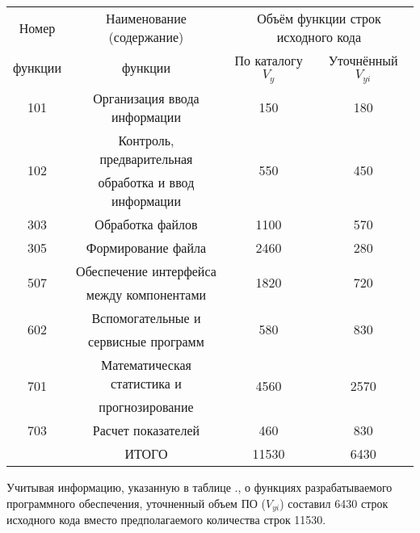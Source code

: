 {{\begin{Center}
		\begin{tabular}{|c|c|c|c|}
		\hline
		Номер  				 & Наименование (содержание) 			& \multicolumn{2}{c|}{Объём функции строк исходного кода} \\ \cline{3-4}
  		функции			     & функции								& По каталогу $V_y$     & Уточнённый $V_{yi}$ 			  \\ \hline
		101 				 & Организация ввода информации         & 150 				    & 180 					          \\ \hline
		\multirow{2}{*}{102} & Контроль, предварительная  			& \multirow{2}{*}{550}  & \multirow{2}{*}{450} 			  \\
		                     & обработка и ввод информации			&                       &                      		      \\ \hline
		303                  & Обработка файлов						& 1100				    & 570							  \\ \hline
		305                  & Формирование файла					& 2460				    & 280							  \\ \hline
		\multirow{2}{*}{507} & Обеспечение интерфейса				& \multirow{2}{*}{1820} & \multirow{2}{*}{720} 			  \\
							 & между компонентами        			&                       &                      		      \\ \hline
		\multirow{2}{*}{602} & Вспомогательные и 					& \multirow{2}{*}{580}  & \multirow{2}{*}{830}			  \\ 
							 & сервисные программ        			&                       &                      		      \\ \hline
		\multirow{2}{*}{701} & Математическая статистика и			& \multirow{2}{*}{4560} & \multirow{2}{*}{2570}			  \\ 
							 & прогнозирование	        			&                       &                      		      \\ \hline
		703                  & Расчет показателей					& 460				    & 830							  \\ \hline
		                     & ИТОГО								& 11530				    & 6430							  \\ \hline
	\end{tabular} \end{Center}}
	\botTablespace

	\redline Учитывая информацию, указанную в таблице \thechaptercntr .\thetablecntr, о функциях разрабатываемого программного обеспечения, уточненный объем ПО ($V_{yi}$) составил 6430 строк исходного кода вместо предполагаемого количества строк 11530. \addtocounter{tablecntr}{1}

	\par
}

